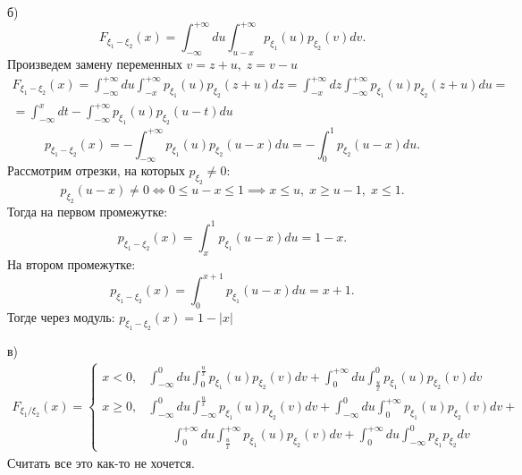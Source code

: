 \begin{subtask}{б)}
\[
F_{\xi_1 - \xi_2}(x) = \int_{-\infty}^{+\infty} du \int^{+\infty}_{u - x} p_{\xi_1}(u) p_{\xi_2}(v)
dv  
.\] Произведем замену переменных $v = z + u, \; z = v - u$  
\begin{align*}
F_{\xi_1 - \xi_2}(x) = \int_{-\infty}^{+\infty} du \int_{-x}^{+\infty} p_{\xi_1}(u) p_{\xi_2}(z + u)
dz = \int_{-x}^{+\infty}dz\int_{-\infty}^{+\infty}p_{\xi_1}(u)p_{\xi_2}(z + u) du =\\=
\int_{-\infty}^{x}dt -\int_{-\infty}^{+\infty}p_{\xi_1}(u)p_{\xi_2}(u - t)du
\end{align*}
\[
  p_{\xi_1 -\xi_2}(x) = -\int_{-\infty}^{+\infty}p_{\xi_1}(u)p_{\xi_2}(u - x)du = -\int_0^1
  p_{\xi_2}(u - x) du
.\] Рассмотрим отрезки, на которых $p_{\xi_2} \neq 0$:
\[
p_{\xi_2}(u - x) \neq 0 \Longleftrightarrow  0 \le u - x \le 1 \implies x \le u, \; x \ge u - 1,
\; x \le  1
.\] Тогда на первом промежутке: \[
p_{\xi_1 - \xi_2}(x) = \int_x^1 p_{\xi_1}(u - x) du = 1 - x
.\] На втором промежутке: \[
p_{\xi_1 - \xi_2}(x) = \int_{0}^{x + 1} p_{\xi_1}(u - x) du = x + 1
.\] Тогде через модуль: $p_{\xi_1 - \xi_2}(x) = 1 - |x|$ 

\end{subtask}

\begin{subtask}{в)}
\begin{align*}
F_{\xi_1 / \xi_2}(x) = \begin{cases}
x < 0, & \int_{-\infty}^{0}du \int_{0}^{\frac{u}{x}} p_{\xi_1}(u) p_{\xi_2}(v) dv + 
\int_{0}^{+\infty} du \int_{\frac{u}{x}}^{0}p_{\xi_1}(u)p_{\xi_2}(v) dv \\
x \ge  0, & \int_{-\infty}^{0}du \int_{-\infty}^{\frac{u}{x}} p_{\xi_1}(u) p_{\xi_2}(v) dv + 
\int_{-\infty}^0 du \int_{0}^{+\infty} p_{\xi_1}(u) p_{\xi_2}(v) dv + \\
& \;\;\;\;\;\;\; 
\int_{0}^{+\infty} du \int_{\frac{u}{x}}^{+\infty} p_{\xi_1}(u) p_{\xi_2}(v) dv + 
\int_{0}^{+\infty} du \int_{-\infty}^{0} p_{\xi_1} p_{\xi_2} dv 
\end{cases}
\end{align*}
Считать все это как-то не хочется.
\end{subtask}

